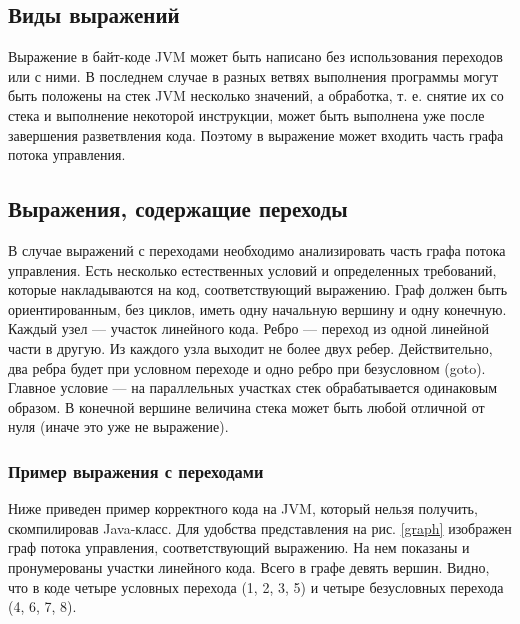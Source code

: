 \documentclass[14pt]{extarticle}
\begin{document}



\subsection{Виды выражений}
Выражение в байт-коде JVM может быть написано без использования переходов или с ними. В последнем случае в разных ветвях выполнения программы могут быть положены на стек JVM несколько значений, а обработка, т. е. снятие их со стека и выполнение некоторой инструкции, может быть выполнена уже после завершения разветвления кода. Поэтому в выражение может входить часть графа потока управления.

\subsection{Выражения, содержащие переходы}
В случае выражений с переходами необходимо анализировать часть графа потока управления. Есть несколько естественных условий и определенных требований, которые накладываются на код, соответствующий выражению. Граф должен быть ориентированным, без циклов, иметь одну начальную вершину и одну конечную. Каждый узел --- участок линейного кода. Ребро --- переход из одной линейной части в другую. Из каждого узла выходит не более двух ребер. Действительно, два ребра будет при условном переходе и одно ребро при безусловном (goto). Главное условие --- на параллельных участках стек обрабатывается одинаковым образом. В конечной вершине величина стека может быть любой отличной от нуля (иначе это уже не выражение).

\subsubsection*{Пример выражения с переходами}
Ниже приведен пример корректного кода на JVM, который нельзя получить, скомпилировав Java-класс. Для удобства представления на рис. \ref{graph} изображен граф потока управления, соответствующий выражению. На нем показаны и пронумерованы участки линейного кода. Всего в графе девять вершин. Видно, что в коде четыре условных перехода (1, 2, 3, 5) и четыре безусловных перехода (4, 6, 7, 8). 
\end{document}
